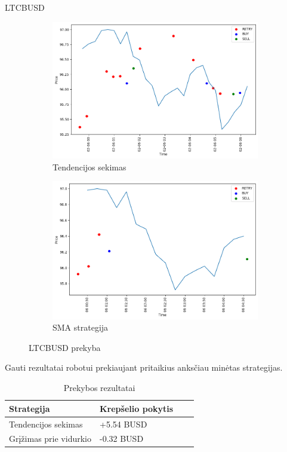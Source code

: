 \documentclass{VUMIFInfKursinis}
\begin{document}
LTCBUSD
\begin{figure}[H]
  \centering
  \begin{subfigure}{.5\textwidth}
    \centering
    \includegraphics[width=\linewidth]{img/LTCBUSD_ARIMA_trades.png}
    \caption{Tendencijos sekimas}
    \label{fig:ltcbusd_arima_trades}
  \end{subfigure}%
  \begin{subfigure}{.5\textwidth}
    \centering
    \includegraphics[width=\linewidth]{img/LTCBUSD_SMA_trades.png}
    \caption{SMA strategija}
    \label{fig:ltcbusd_sma_trades}
  \end{subfigure}
  \caption{LTCBUSD prekyba}
  \label{fig:ltcbusd_trades}
\end{figure}

Gauti rezultatai robotui prekiaujant pritaikius anksčiau minėtas strategijas.

\begin{table}[H]
  \centering
  \begin{tabularx}{\linewidth}{|X|X|X|X|}
    \hline
    Strategija             & Krepšelio pokytis \\
    \hline
    Tendencijos sekimas    & +5.54 BUSD        \\
    \hline
    Grįžimas prie vidurkio & -0.32 BUSD        \\
    \hline
  \end{tabularx}
  \caption{Prekybos rezultatai}
  \label{table:preykos_rezultatai}
\end{table}
\end{document}
